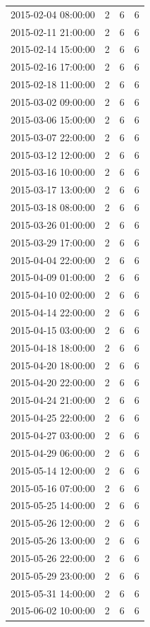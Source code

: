 \begin{tabular}{lrrr}
2015-02-04 08:00:00 & 2 & 6 & 6 \\
2015-02-11 21:00:00 & 2 & 6 & 6 \\
2015-02-14 15:00:00 & 2 & 6 & 6 \\
2015-02-16 17:00:00 & 2 & 6 & 6 \\
2015-02-18 11:00:00 & 2 & 6 & 6 \\
2015-03-02 09:00:00 & 2 & 6 & 6 \\
2015-03-06 15:00:00 & 2 & 6 & 6 \\
2015-03-07 22:00:00 & 2 & 6 & 6 \\
2015-03-12 12:00:00 & 2 & 6 & 6 \\
2015-03-16 10:00:00 & 2 & 6 & 6 \\
2015-03-17 13:00:00 & 2 & 6 & 6 \\
2015-03-18 08:00:00 & 2 & 6 & 6 \\
2015-03-26 01:00:00 & 2 & 6 & 6 \\
2015-03-29 17:00:00 & 2 & 6 & 6 \\
2015-04-04 22:00:00 & 2 & 6 & 6 \\
2015-04-09 01:00:00 & 2 & 6 & 6 \\
2015-04-10 02:00:00 & 2 & 6 & 6 \\
2015-04-14 22:00:00 & 2 & 6 & 6 \\
2015-04-15 03:00:00 & 2 & 6 & 6 \\
2015-04-18 18:00:00 & 2 & 6 & 6 \\
2015-04-20 18:00:00 & 2 & 6 & 6 \\
2015-04-20 22:00:00 & 2 & 6 & 6 \\
2015-04-24 21:00:00 & 2 & 6 & 6 \\
2015-04-25 22:00:00 & 2 & 6 & 6 \\
2015-04-27 03:00:00 & 2 & 6 & 6 \\
2015-04-29 06:00:00 & 2 & 6 & 6 \\
2015-05-14 12:00:00 & 2 & 6 & 6 \\
2015-05-16 07:00:00 & 2 & 6 & 6 \\
2015-05-25 14:00:00 & 2 & 6 & 6 \\
2015-05-26 12:00:00 & 2 & 6 & 6 \\
2015-05-26 13:00:00 & 2 & 6 & 6 \\
2015-05-26 22:00:00 & 2 & 6 & 6 \\
2015-05-29 23:00:00 & 2 & 6 & 6 \\
2015-05-31 14:00:00 & 2 & 6 & 6 \\
2015-06-02 10:00:00 & 2 & 6 & 6 \\

\end{tabular}
